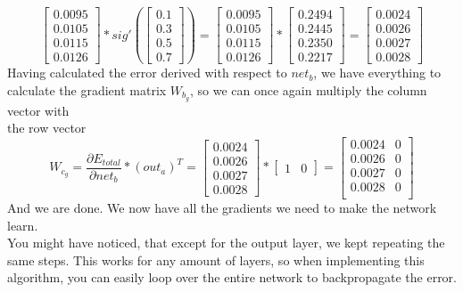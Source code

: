 \documentclass[11pt, halfparskip]{article}
\begin{document}
    \[
    	\begin{bmatrix}
        		0.0095\\
        		0.0105\\
        		0.0115\\
        		0.0126
        	\end{bmatrix}
        	*
        	sig'(
        	\begin{bmatrix}
        		0.1\\
        		0.3\\
        		0.5\\
        		0.7
        	\end{bmatrix}
        	) =
        	\begin{bmatrix}
        		0.0095\\
        		0.0105\\
        		0.0115\\
        		0.0126
        	\end{bmatrix}
        	*
        	\begin{bmatrix}
        		0.2494\\
        		0.2445\\
        		0.2350\\
        		0.2217
        	\end{bmatrix}
        	=
        	\begin{bmatrix}
        		0.0024\\
        		0.0026\\
        		0.0027\\
        		0.0028
        	\end{bmatrix}
    \]
    Having calculated the error derived with respect to $net_b$, we have everything to calculate the gradient matrix $W_{b_g}$, so we can once again multiply the column vector with\\
    the row vector
    \[
    	W_{c_g} = \frac{\partial E_{total}}{\partial net_b} * (out_a)^T = 
    	\begin{bmatrix}
        		0.0024\\
        		0.0026\\
        		0.0027\\
        		0.0028
        	\end{bmatrix}
        	*
        	\begin{bmatrix}
        		1 & 0
        	\end{bmatrix}
        	=
        	\begin{bmatrix}
        		0.0024 & 0\\
        		0.0026 & 0\\
        		0.0027 & 0\\
        		0.0028 & 0\\
        	\end{bmatrix}
    \]
    And we are done. We now have all the gradients we need to make the network learn.\\
    You might have noticed, that except for the output layer, we kept repeating the same steps. This works for any amount of layers, so when implementing this algorithm, you
    can easily loop over the entire network to backpropagate the error.
    
\end{document}
